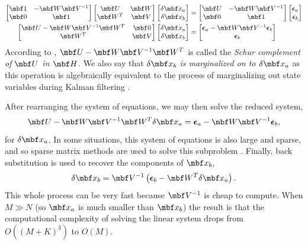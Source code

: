 \documentclass[11pt,a4,oneside]{article}
\begin{document}
\begin{subequations}
\begin{flalign}
  \bbm
    \mbf 1 & -\mbf W \mbf V^{-1}\\
    \mbf 0 & \mbf 1
  \ebm
  \bbm 
    \mbf U   & \mbf W \\
    \mbf W^T & \mbf V 
  \ebm
  \bbm
    \mbfdel x_a\\
    \mbfdel x_b
  \ebm
  &=
  \bbm
    \mbf U & -\mbf W \mbf V^{-1}  \\
    \mbf 0 & \mbf 1
  \ebm
  \bbm
    \mbs \epsilon_a\\
    \mbs \epsilon_b
  \ebm\\
  \bbm 
    \mbf U - \mbf W \mbf V^{-1} \mbf W^T  & \mbf 0 \\
    \mbf W^T & \mbf V 
  \ebm
  \bbm
    \mbfdel x_a\\
    \mbfdel x_b
  \ebm
  &=
  \bbm
    \mbs \epsilon_a - \mbf W \mbf V^{-1} \mbs \epsilon_b \\
    \mbs \epsilon_b
  \ebm
\end{flalign}
\end{subequations}
According to \citet{Triggs0000}, $\mbf U - \mbf W \mbf V^{-1} \mbf W^T$ is called the {\em Schur complement of $\mbf U$ in $\mbf H$}. We also say that {\em $\mbfdel x_b$ is  marginalized on to $\mbfdel x_a$} as this operation is algebraically equivalent to the process of marginalizing out state variables during Kalman filtering \citep{Sibley0800}. 

After rearranging the system of equations, we may then solve the reduced system,
  \begin{equation}
    \label{eq:reduced-system}
    \mbf U - \mbf W \mbf V^{-1} \mbf W^T   \mbfdel x_{a} = \mbs \epsilon_a - \mbf W \mbf V^{-1} \mbs \epsilon_b,
  \end{equation}
for $\mbfdel x_a$. In some situations, this system of equations is also large and sparse, and so sparse matrix methods are used to solve this subproblem \citep{Davis0600}. Finally, back substitution is used to recover the components of $\mbf x_b$,
\begin{equation}
  \label{eq:back-substitute}
   \mbfdel x_b = \mbf V^{-1}\left(\mbs \epsilon_b - \mbf W^T \mbfdel x_{a} \right).
\end{equation}
This whole process can be very fast because $\mbf V^{-1}$ is cheap to compute. When $M \gg N$ (so $\mbf x_a$ is much smaller than $\mbf x_b$) the result is that the computational complexity of solving the linear system drops from $O((M + K)^{3})$ to $O(M)$.
\end{document}
